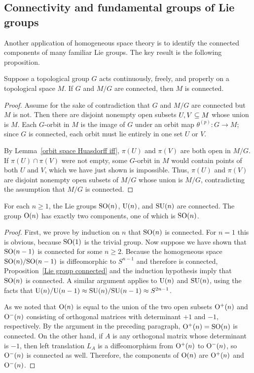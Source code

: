 \subsection{Connectivity and fundamental groups of Lie groups}
Another application of homogeneous space theory is to identify the connected components of many familiar Lie groups. The key result is the following proposition.
\begin{proposition}\label{Lie group connected}
Suppose a topological group $G$ acts continuously, freely, and properly on a topological space $M$. If $G$ and $M/G$ are connected, then $M$ is connected.
\end{proposition}
\begin{proof}
Assume for the sake of contradiction that $G$ and $M/G$ are connected but $M$ is not. Then there are disjoint nonempty open subsets $U,V\subseteq M$ whose union is $M$. Each $G$-orbit in $M$ is the image of $G$ under an orbit map $\theta^{(p)}:G\to M$; since $G$ is connected, each orbit must lie entirely in one set $U$ or $V$.\par
By Lemma~\ref{orbit space Huasdorff iff}, $\pi(U)$ and $\pi(V)$ are both open in $M/G$. If $\pi(U)\cap\pi(V)$ were not empty, some $G$-orbit in $M$ would contain points of both $U$ and $V$, which we have just shown is impossible. Thus, $\pi(U)$ and $\pi(V)$ are disjoint nonempty open subsets of $M/G$ whose union is $M/G$, contradicting the assumption that $M/G$ is connected.
\end{proof}
\begin{proposition}
For each $n\geq1$, the Lie groups $\mathrm{SO}(n)$, $\mathrm{U}(n)$, and $\mathrm{SU}(n)$ are
connected. The group $\mathrm{O}(n)$ has exactly two components, one of which is $\mathrm{SO}(n)$.
\end{proposition}
\begin{proof}
First, we prove by induction on $n$ that $\mathrm{SO}(n)$ is connected. For $n=1$ this is obvious, because $\mathrm{SO}(1)$ is the trivial group. Now suppose we have shown that $\mathrm{SO}(n-1)$ is connected for some $n\geq 2$. Because the homogeneous space $\mathrm{SO}(n)/\mathrm{SO}(n-1)$ is diffeomorphic to $S^{n-1}$ and therefore is connected, Proposition~\ref{Lie group connected} and the induction hypothesis imply that $\mathrm{SO}(n)$ is connected. A similar argument applies to $\mathrm{U}(n)$ and $\mathrm{SU}(n)$, using the facts that $\mathrm{U}(n)/\mathrm{U}(n-1)\approx\mathrm{SU}(n)/\mathrm{SU}(n-1)\approx S^{2n-1}$.\par
As we noted that $\mathrm{O}(n)$ is equal to the union of the two open subsets $\mathrm{O}^+(n)$ and $\mathrm{O}^-(n)$ consisting of orthogonal matrices with determinant $+1$ and $-1$, respectively. By the argument in the preceding paragraph, $\mathrm{O}^+(n)=\mathrm{SO}(n)$ is connected. On the other hand, if $A$ is any orthogonal matrix whose determinant is $-1$, then left translation $L_A$ is a diffeomorphism from $\mathrm{O}^+(n)$ to $\mathrm{O}^-(n)$, so $\mathrm{O}^-(n)$ is connected as well. Therefore, the components of $\mathrm{O}(n)$ are $\mathrm{O}^+(n)$ and $\mathrm{O}^-(n)$.
\end{proof}
